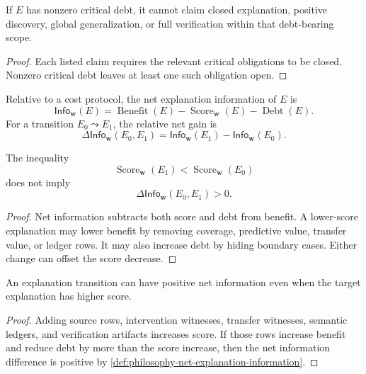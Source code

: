 \begin{corollary}
\label{cor:philosophy-critical-debt-blocks-strong-explanation-claims}
If $E$ has nonzero critical debt, it cannot claim closed explanation,
positive discovery, global generalization, or full verification within
that debt-bearing scope.
\end{corollary}
\begin{proof}
Each listed claim requires the relevant critical obligations to be
closed. Nonzero critical debt leaves at least one such obligation open.
\end{proof}

\begin{definition}
\label{def:philosophy-net-explanation-information}
Relative to a cost protocol, the net explanation information of $E$ is
$$
\mathsf{Info}_{\mathbf w}(E)
=
\operatorname{Benefit}(E)
-
\operatorname{Score}_{\mathbf w}(E)
-
\operatorname{Debt}(E).
$$
For a transition $E_0\leadsto E_1$, the relative net gain is
$$
\Delta\mathsf{Info}_{\mathbf w}(E_0,E_1)
=
\mathsf{Info}_{\mathbf w}(E_1)
-
\mathsf{Info}_{\mathbf w}(E_0).
$$
\end{definition}

\begin{theorem}
\label{thm:philosophy-lower-score-not-positive-net-information}
The inequality
$$
\operatorname{Score}_{\mathbf w}(E_1)
<
\operatorname{Score}_{\mathbf w}(E_0)
$$
does not imply
$$
\Delta\mathsf{Info}_{\mathbf w}(E_0,E_1)>0.
$$
\end{theorem}
\begin{proof}
Net information subtracts both score and debt from benefit. A lower-score
explanation may lower benefit by removing coverage, predictive value,
transfer value, or ledger rows. It may also increase debt by hiding
boundary cases. Either change can offset the score decrease.
\end{proof}

\begin{theorem}
\label{thm:philosophy-higher-score-positive-net-information}
An explanation transition can have positive net information even when the
target explanation has higher score.
\end{theorem}
\begin{proof}
Adding source rows, intervention witnesses, transfer witnesses, semantic
ledgers, and verification artifacts increases score. If those rows
increase benefit and reduce debt by more than the score increase, then
the net information difference is positive by
\autoref{def:philosophy-net-explanation-information}.
\end{proof}

